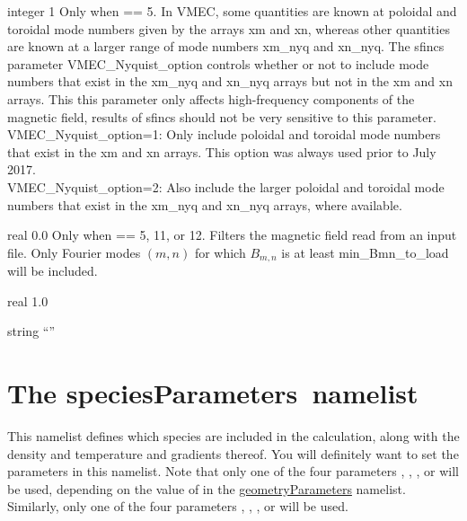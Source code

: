 {integer}
{1}
{Only when  == 5.}
{In VMEC, some quantities are known at poloidal and toroidal mode numbers given by the arrays {\ttfamily xm} and
{\ttfamily xn}, whereas other quantities are known at a larger range of mode numbers {\ttfamily xm\_nyq} and {\ttfamily xn\_nyq}.
The sfincs parameter {\ttfamily VMEC\_Nyquist\_option}
controls whether or not to include mode numbers that exist in the {\ttfamily xm\_nyq} and {\ttfamily xn\_nyq}
arrays but not in the {\ttfamily xm} and {\ttfamily xn} arrays.
This this parameter only affects high-frequency components of the magnetic field, results of sfincs
should not be very sensitive to this parameter.
\\

{\ttfamily VMEC\_Nyquist\_option}=1: Only include poloidal and toroidal mode numbers that exist
in the {\ttfamily xm} and {\ttfamily xn} arrays.  This option was always used prior to July 2017.\\

{\ttfamily VMEC\_Nyquist\_option}=2: Also include the larger poloidal and toroidal mode numbers that exist
in the {\ttfamily xm\_nyq} and {\ttfamily xn\_nyq} arrays, where available.
}

\myhrule

{real}
{0.0}
{Only when  == 5, 11, or 12.}
{Filters the magnetic field read from an input file.  Only Fourier modes $(m,n)$ for which $B_{m,n}$ is at least {\ttfamily min\_Bmn\_to\_load} will be included.}

\myhrule

{real}
{1.0}
{}
{}

\myhrule

{string}
{``''}
{}
{}




\section{The {\ttfamily speciesParameters}~namelist}

This namelist defines which species are included in the calculation, along with the density and temperature and gradients thereof.
You will definitely want to set the parameters in this namelist.
Note that only one of the four parameters 
, 
, 
, or
will be used, depending on the value of 
in the {\ttfamily \hyperref[sec:geometryParameters]{geometryParameters}} namelist.
Similarly, only one of the four parameters
, 
, 
, or
will be used.

